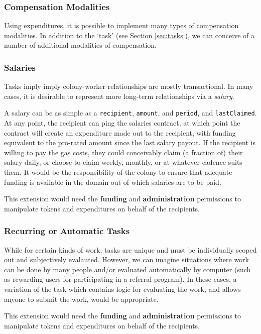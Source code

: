 \subsubsection{Compensation Modalities}\label{sec:salary}

Using expenditures, it is possible to implement many types of compensation modalities. In addition to the `task' (see Section \ref{sec:tasks}), we can conceive of a number of additional modalities of compensation.

\subsubsection*{Salaries}

Tasks imply imply colony-worker relationships are mostly transactional. In many cases, it is desirable to represent more long-term relationships via a \emph{salary}.

A salary can be as simple as a \texttt{recipient}, \texttt{amount}, and \texttt{period}, and \texttt{lastClaimed}. At any point, the recipient can ping the salaries contract, at which point the contract will create an expenditure made out to the recipient, with funding equivalent to the pro-rated amount since the last salary payout. If the recipient is willing to pay the gas costs, they could conceivably claim (a fraction of) their salary daily, or choose to claim weekly, monthly, or at whatever cadence suits them. It would be the responsibility of the colony to ensure that adequate funding is available in the domain out of which salaries are to be paid.

This extension would need the \textbf{funding} and \textbf{administration} permissions to manipulate tokens and expenditures on behalf of the recipients.

\subsubsection*{Recurring or Automatic Tasks}

While for certain kinds of work, tasks are unique and must be individually scoped out and subjectively evalauted. However, we can imagine situations where work can be done by many people and/or evaluated automatically by computer (such as rewarding users for participating in a referral program). In these cases, a variation of the task which contains logic for evaluating the work, and allows anyone to submit the work, would be appropriate.

This extension would need the \textbf{funding} and \textbf{administration} permissions to manipulate tokens and expenditures on behalf of the recipients.

